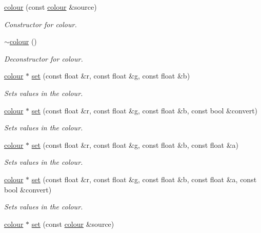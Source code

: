 \begin{DoxyCompactItemize}
\hyperlink{classflounder_1_1colour_ad13a6e7245e03a49474958afaa174025}{colour} (const \hyperlink{classflounder_1_1colour}{colour} \&source)
\begin{DoxyCompactList}\small\item\em Constructor for colour. \end{DoxyCompactList}\item 
\hyperlink{classflounder_1_1colour_ab2ccda8311376ec5a54243b1e9c5c694}{$\sim$colour} ()
\begin{DoxyCompactList}\small\item\em Deconstructor for colour. \end{DoxyCompactList}\item 
\hyperlink{classflounder_1_1colour}{colour} $\ast$ \hyperlink{classflounder_1_1colour_a2dad1722e39dd03a51b59ccab45035e2}{set} (const float \&r, const float \&g, const float \&b)
\begin{DoxyCompactList}\small\item\em Sets values in the colour. \end{DoxyCompactList}\item 
\hyperlink{classflounder_1_1colour}{colour} $\ast$ \hyperlink{classflounder_1_1colour_ad33c2b45456403221e46c980c07c3994}{set} (const float \&r, const float \&g, const float \&b, const bool \&convert)
\begin{DoxyCompactList}\small\item\em Sets values in the colour. \end{DoxyCompactList}\item 
\hyperlink{classflounder_1_1colour}{colour} $\ast$ \hyperlink{classflounder_1_1colour_a3f3c46b24810827cda5949ce813258a9}{set} (const float \&r, const float \&g, const float \&b, const float \&a)
\begin{DoxyCompactList}\small\item\em Sets values in the colour. \end{DoxyCompactList}\item 
\hyperlink{classflounder_1_1colour}{colour} $\ast$ \hyperlink{classflounder_1_1colour_af6f72267ba0dfbf4235bd820103249e7}{set} (const float \&r, const float \&g, const float \&b, const float \&a, const bool \&convert)
\begin{DoxyCompactList}\small\item\em Sets values in the colour. \end{DoxyCompactList}\item 
\hyperlink{classflounder_1_1colour}{colour} $\ast$ \hyperlink{classflounder_1_1colour_a7fabd96bd7baa0aaa398e7f55aa6db81}{set} (const \hyperlink{classflounder_1_1colour}{colour} \&source)

\end{DoxyCompactItemize}
